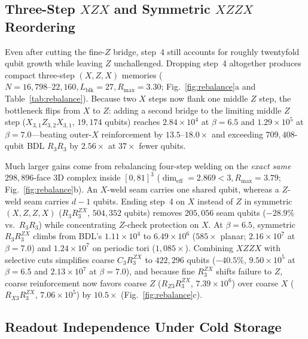 \documentclass[aps,prx,reprint,superscriptaddress,nofootinbib,floatfix]{revtex4-2}
\begin{document}
\subsection{Three-Step \texorpdfstring{$XZX$}{XZX} and Symmetric \texorpdfstring{$XZZX$}{XZZX} Reordering}

Even after cutting the fine-$Z$ bridge, step~4 still accounts for roughly twentyfold qubit growth while leaving $Z$ unchallenged. Dropping step~4 altogether produces compact three-step $(X, Z, X)$ memories ($N = 16{,}798\text{--}22{,}160, L_{\mathrm{blk}} = 27, R_{\max} = 3.30$; Fig.~\ref{fig:rebalance}a and Table~\ref{tab:rebalance}). Because two $X$ steps now flank one middle $Z$ step, the bottleneck flips from $X$ to $Z$: adding a second bridge to the limiting middle $Z$ step ($X_{3,1} Z_{3,2} X_{3,1}$, $19{,}174$ qubits) reaches $2.84 \times 10^4$ at $\beta = 6.5$ and $1.29 \times 10^5$ at $\beta = 7.0$---beating outer-$X$ reinforcement by $13.5\text{--}18.0\times$ and exceeding $709{,}408$-qubit BDL $R_3 R_3$ by $2.56\times$ at $37\times$ fewer qubits.

Much larger gains come from rebalancing four-step welding on the \emph{exact same} $298{,}896$-face 3D complex inside $[0, 81]^3$ ($\dim_{\mathrm{eff}} = 2.869 < 3, R_{\max} = 3.79$; Fig.~\ref{fig:rebalance}b). An $X$-weld seam carries one shared qubit, whereas a $Z$-weld seam carries $d - 1$ qubits. Ending step~4 on $X$ instead of $Z$ in symmetric $(X, Z, Z, X)$ ($R_3 R_3^{ZX}$, $504{,}352$ qubits) removes $205{,}056$ seam qubits ($-28.9\%$ vs.\ $R_3 R_3$) while concentrating $Z$-check protection on $X$. At $\beta = 6.5$, symmetric $R_3 R_3^{ZX}$ climbs from BDL's $1.11 \times 10^4$ to $6.49 \times 10^6$ ($585\times$ planar; $2.16 \times 10^7$ at $\beta = 7.0$) and $1.24 \times 10^7$ on periodic tori ($1{,}085\times$). Combining $XZZX$ with selective cuts simplifies coarse $C_3 R_3^{ZX}$ to $422{,}296$ qubits ($-40.5\%$, $9.50 \times 10^5$ at $\beta = 6.5$ and $2.13 \times 10^7$ at $\beta = 7.0$), and because fine $R_3^{ZX}$ shifts failure to $Z$, coarse reinforcement now favors coarse $Z$ ($R_{Z3} R_3^{ZX}$, $7.39 \times 10^6$) over coarse $X$ ($R_{X3} R_3^{ZX}$, $7.06 \times 10^5$) by $10.5\times$ (Fig.~\ref{fig:rebalance}c).

\subsection{Readout Independence Under Cold Storage}
\end{document}

